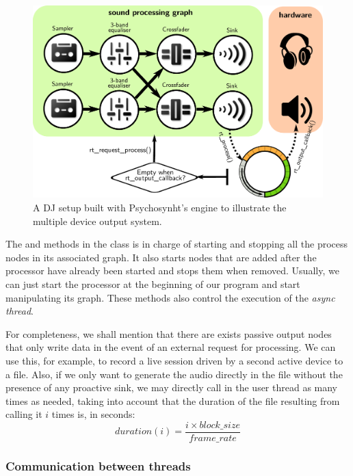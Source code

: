 \begin{figure}[h!]
  \centering
  \includegraphics[width=\textwidth]{pic/djscheme.pdf}
  \caption{A DJ setup built with Psychosynht's engine to illustrate the multiple device output system.}
  \label{fig:djscheme}
\end{figure}

The  and  methods in the 
class is in charge of starting and stopping all the process nodes in
its associated graph. It also starts nodes that are added after the
processor have already been started and stops them when
removed. Usually, we can just start the processor at the beginning of
our program and start manipulating its graph. These methods also
control the execution of the \emph{async thread}. 

For completeness, we shall mention that there are exists passive
output nodes that only write data in the event of an external request
for processing. We can use this, for example, to record a live session
driven by a second active device to a file. Also, if we only want to
generate the audio directly in the file without the presence of any
proactive sink, we may directly call  in
the user thread as many times as needed, taking into account that the
duration of the file resulting from calling it $i$ times is, in
seconds:
\begin{equation}
  duration(i) = \frac{i \times block\_size}{frame\_rate}   
\end{equation}

\subsubsection{Communication between threads}

